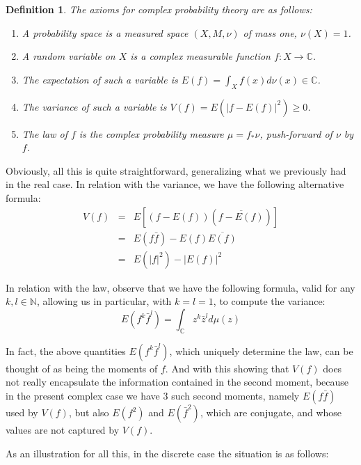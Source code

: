 \documentclass[12pt]{amsbook}
\newtheorem{definition}[theorem]{Definition}
\begin{document}
\begin{definition}
The axioms for complex probability theory are as follows:
\begin{enumerate}
\item A probability space is a measured space $(X,M,\nu)$ of mass one, $\nu(X)=1$.

\item A random variable on $X$ is a complex measurable function $f:X\to\mathbb C$.

\item The expectation of such a variable is $E(f)=\int_Xf(x)d\nu(x)\in\mathbb C$.

\item The variance of such a variable is $V(f)=E(|f-E(f)|^2)\geq0$.

\item The law of $f$ is the complex probability measure $\mu=f_*\nu$, push-forward of $\nu$ by $f$.
\end{enumerate}
\end{definition}

Obviously, all this is quite straightforward, generalizing what we previously had in the real case. In relation with the variance, we have the following alternative formula:
\begin{eqnarray*}
V(f)
&=&E\left[(f-E(f))(\overline{f-E(f)})\right]\\
&=&E(f\bar{f})-E(f)\overline{E(f)}\\
&=&E(|f|^2)-|E(f)|^2
\end{eqnarray*}

In relation with the law, observe that we have the following formula, valid for any  $k,l\in\mathbb N$, allowing us in particular, with $k=l=1$, to compute the variance:
$$E(f^k\bar{f}^l)=\int_\mathbb Cz^k\bar{z}^ld\mu(z)$$

In fact, the above quantities $E(f^k\bar{f}^l)$, which uniquely determine the law, can be thought of as being the moments of $f$. And with this showing that $V(f)$ does not really encapsulate the information contained in the second moment, because in the present complex case we have 3 such second moments, namely $E(f\bar{f})$ used by $V(f)$, but also $E(f^2)$ and $E(\bar{f}^2)$, which are conjugate, and whose values are not captured by $V(f)$.

\bigskip

As an illustration for all this, in the discrete case the situation is as follows:

\end{document}
